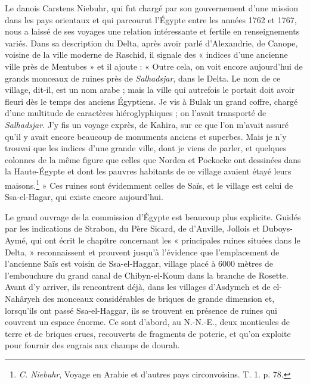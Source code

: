 \documentclass[a4paper, 11pt, oneside]{article}
\begin{document}
Le danois Carstens Niebuhr, qui fut chargé par son gouvernement d'une mission dans les pays orientaux et qui parcourut l'Égypte entre les années 1762 et 1767, nous a laissé de ses voyages une relation intéressante et fertile en renseignements variés. Dans sa description du Delta, après avoir parlé d'Alexandrie, de Canope, voisine de la ville moderne de Raschid, il signale des « indices d'une ancienne ville près de Mentubes » et il ajoute : « Outre cela, on voit encore aujourd'hui de grands monceaux de ruines près de \emph{Salhadsjar}, dans le Delta. Le nom de ce village, dit-il, est un nom arabe ; mais la ville qui autrefois le portait doit avoir fleuri dès le temps des anciens Égyptiens. Je vis à Bulak un grand coffre, chargé d'une multitude de caractères hiéroglyphiques ; on l'avait transporté de \emph{Salhadsjar}. J'y fis un voyage exprès, de Kahira, sur ce que l'on m'avait assuré qu'il y avait encore beaucoup de monuments anciens et superbes. Mais je n'y trouvai que les indices d'une grande ville, dont je viens de parler, et quelques colonnes de la même figure que celles que Norden et Pockocke ont dessinées dans la Haute-Égypte et dont les pauvres habitants de ce village avaient étayé leurs maisons.\footnote{\emph{C. Niebuhr}, Voyage en Arabie et d'autres pays circonvoisins. T. 1. p. 78.} » Ces ruines sont évidemment celles de Saïs, et le village est celui de Ssa-el-Hagar, qui existe encore aujourd'hui.

Le grand ouvrage de la commission d'Égypte est beaucoup plus explicite. Guidés par les indications de Strabon, du Père Sicard, de d'Anville, Jollois et Duboys-Aymé, qui ont écrit le chapitre concernant les « principales ruines situées dans le Delta, » reconnaissent et prouvent jusqu'à l'évidence que l'emplacement de l'ancienne Saïs est voisin de Ssa-el-Haggar, village placé à 6000 mètres de l'embouchure du grand canal de Chibyn-el-Koum dans la branche de Rosette. Avant d'y arriver, ils rencontrent déjà, dans les villages d'Asdymeh et de el-Nahâryeh des monceaux considérables de briques de grande dimension et, lorsqu'ils ont passé Ssa-el-Haggar, ils se trouvent en présence de ruines qui couvrent un espace énorme. Ce sont d'abord, au N.-N.-E., deux monticules de terre et de briques crues, recouverts de fragments de poterie, et qu'on exploite pour fournir des engrais aux champs de dourah.
\end{document}
